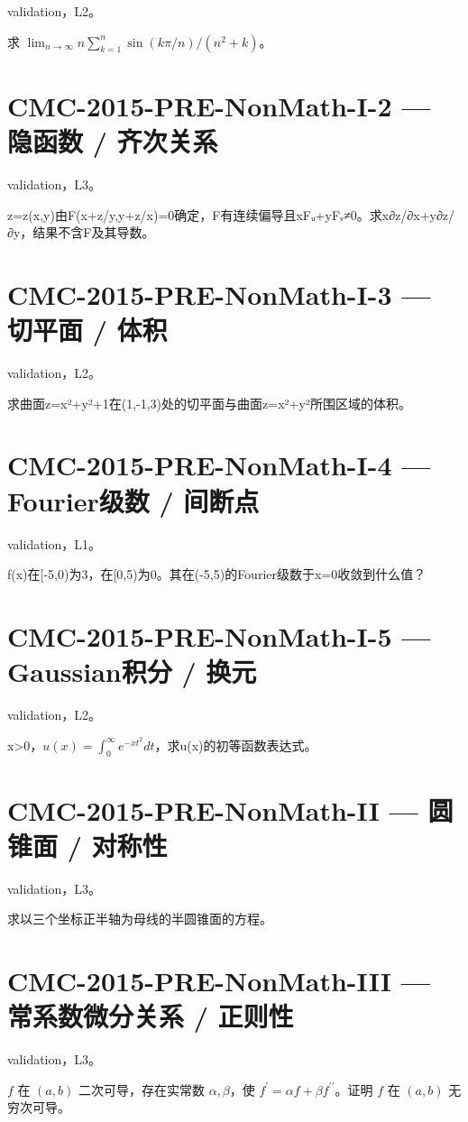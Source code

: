 \documentclass[UTF8]{ctexart}
\begin{document}
validation，L2。

求 $\lim_{n\to\infty}n\sum_{k=1}^n\sin(k\pi/n)/(n^2+k)$。

\section*{CMC-2015-PRE-NonMath-I-2 — 隐函数 / 齐次关系}

validation，L3。

z=z(x,y)由F(x+z/y,y+z/x)=0确定，F有连续偏导且xFᵤ+yFᵥ≠0。求x∂z/∂x+y∂z/∂y，结果不含F及其导数。

\section*{CMC-2015-PRE-NonMath-I-3 — 切平面 / 体积}

validation，L2。

求曲面z=x²+y²+1在(1,-1,3)处的切平面与曲面z=x²+y²所围区域的体积。

\section*{CMC-2015-PRE-NonMath-I-4 — Fourier级数 / 间断点}

validation，L1。

f(x)在[-5,0)为3，在[0,5)为0。其在(-5,5)的Fourier级数于x=0收敛到什么值？

\section*{CMC-2015-PRE-NonMath-I-5 — Gaussian积分 / 换元}

validation，L2。

x>0，$u(x)=\int_0^\infty e^{-xt^2}dt$，求u(x)的初等函数表达式。

\section*{CMC-2015-PRE-NonMath-II — 圆锥面 / 对称性}

validation，L3。

求以三个坐标正半轴为母线的半圆锥面的方程。

\section*{CMC-2015-PRE-NonMath-III — 常系数微分关系 / 正则性}

validation，L3。

$f$ 在 $(a,b)$ 二次可导，存在实常数 $\alpha,\beta$，使 $f^{\prime}=\alpha f+\beta f^{\prime\prime}$。证明 $f$ 在 $(a,b)$ 无穷次可导。
\end{document}
